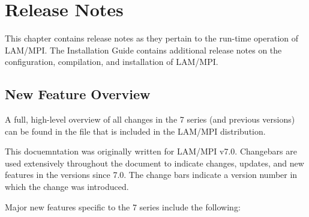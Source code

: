 %
% 
%
%

\chapter{Release Notes}
\label{sec:release-notes}

This chapter contains release notes as they pertain to the run-time
operation of LAM/MPI.  The Installation Guide contains additional
release notes on the configuration, compilation, and installation of
LAM/MPI.


\section{New Feature Overview}

A full, high-level overview of all changes in the 7 series (and
previous versions) can be found in the  file that is
included in the LAM/MPI distribution.

This docuemntation was originally written for LAM/MPI v7.0.
Changebars are used extensively throughout the document to indicate
changes, updates, and new features in the versions since 7.0.  The
change bars indicate a version number in which the change was
introduced.

Major new features specific to the 7 series include the following:


